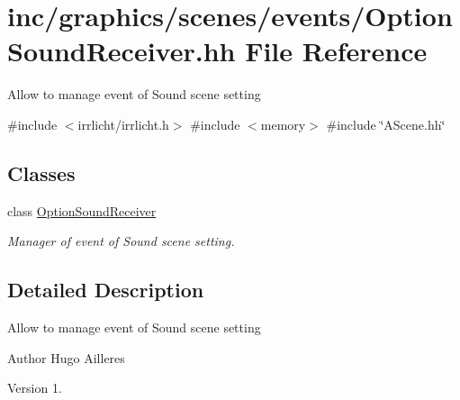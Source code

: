 \hypertarget{OptionSoundReceiver_8hh}{}\section{inc/graphics/scenes/events/\+Option\+Sound\+Receiver.hh File Reference}
\label{OptionSoundReceiver_8hh}


Allow to manage event of Sound scene setting  


{\ttfamily \#include $<$irrlicht/irrlicht.\+h$>$}\newline
{\ttfamily \#include $<$memory$>$}\newline
{\ttfamily \#include \char`\"{}A\+Scene.\+hh\char`\"{}}\newline
\subsection*{Classes}
\begin{DoxyCompactItemize}
\item 
class \hyperlink{classOptionSoundReceiver}{Option\+Sound\+Receiver}
\begin{DoxyCompactList}\small\item\em Manager of event of Sound scene setting. \end{DoxyCompactList}\end{DoxyCompactItemize}


\subsection{Detailed Description}
Allow to manage event of Sound scene setting 

\begin{DoxyAuthor}{Author}
Hugo Ailleres 
\end{DoxyAuthor}
\begin{DoxyVersion}{Version}
1. 
\end{DoxyVersion}
